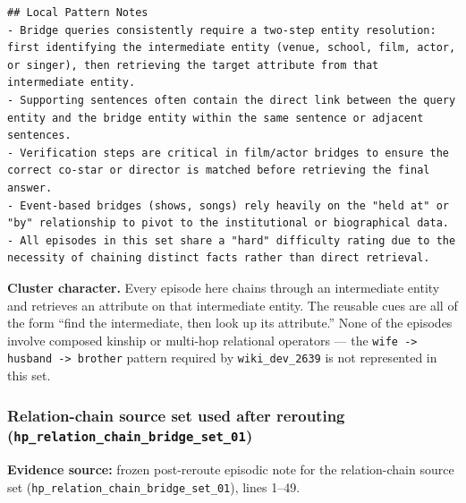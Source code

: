 \begin{lstlisting}
## Local Pattern Notes
- Bridge queries consistently require a two-step entity resolution: first identifying the intermediate entity (venue, school, film, actor, or singer), then retrieving the target attribute from that intermediate entity.
- Supporting sentences often contain the direct link between the query entity and the bridge entity within the same sentence or adjacent sentences.
- Verification steps are critical in film/actor bridges to ensure the correct co-star or director is matched before retrieving the final answer.
- Event-based bridges (shows, songs) rely heavily on the "held at" or "by" relationship to pivot to the institutional or biographical data.
- All episodes in this set share a "hard" difficulty rating due to the necessity of chaining distinct facts rather than direct retrieval.
\end{lstlisting}

\textbf{Cluster character.} Every episode here chains through an intermediate entity and retrieves an attribute on that intermediate entity. The reusable cues are all of the form ``find the intermediate, then look up its attribute.'' None of the episodes involve composed kinship or multi-hop relational operators --- the \texttt{wife -> husband -> brother} pattern required by \texttt{wiki\_dev\_2639} is not represented in this set.

\subsubsection{Relation-chain source set used after rerouting (\texttt{hp\_relation\_chain\_bridge\_set\_01})}

\textbf{Evidence source:} frozen post-reroute episodic note for the relation-chain source set (\texttt{hp\_relation\_chain\_bridge\_set\_01}), lines 1--49.

